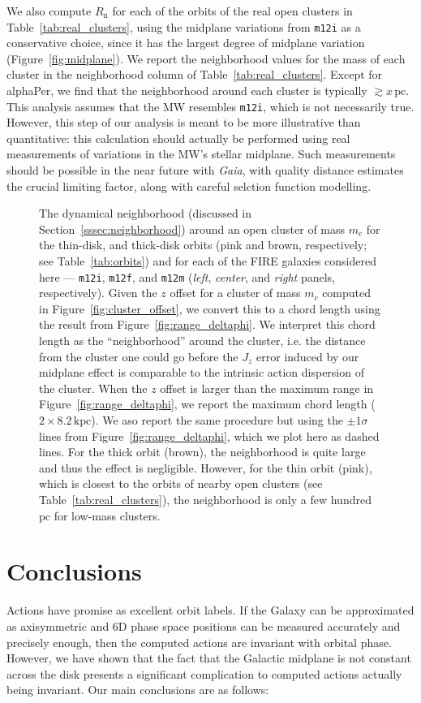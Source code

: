 \documentclass[twocolumn]{aastex62}
\newcommand{\pc}{\text{pc}}
\newcommand{\kpc}{\text{kpc}}
\newcommand{\mi}{\texttt{m12i}}
\newcommand{\mf}{\texttt{m12f}}
\newcommand{\mm}{\texttt{m12m}}
\newcommand{\n}{\text{n}}
\newcommand{\thincolor}{pink}
\newcommand{\thickcolor}{brown}
\begin{document}
We also compute $R_{\n}$ for each of the orbits of the real open clusters in
Table~\ref{tab:real_clusters}, using the midplane variations from
\mi{} as a conservative choice, since it has the largest degree of
midplane variation (Figure~\ref{fig:midplane}). We report the neighborhood
values for the mass of each cluster in the neighborhood column of
Table~\ref{tab:real_clusters}. Except for alphaPer, we find that the
neighborhood around each cluster is typically $\gtrsim x\,\pc$. This analysis
assumes that the MW resembles \mi{}, which is not necessarily true. However,
this step of our analysis is meant to be more illustrative than quantitative:
this calculation should actually be performed using real measurements of
variations in the MW's stellar midplane. Such measurements should be possible
in the near future with {\em Gaia}, with quality distance estimates the
crucial limiting factor, along with careful selction function modelling.

\begin{figure}
\caption{The dynamical neighborhood (discussed in
Section~\ref{sssec:neighborhood}) around an open cluster of mass $m_c$ for the
thin-disk, and thick-disk orbits (\thincolor{} and \thickcolor{},
respectively; see Table~\ref{tab:orbits}) and for each of the FIRE galaxies
considered here ---
\mi{}, \mf{}, and \mm{} ({\em left}, {\em center}, and {\em right} panels,
respectively). Given the $z$ offset for a cluster of mass $m_c$ computed in
Figure~\ref{fig:cluster_offset}, we convert this to a chord length using the
result from Figure~\ref{fig:range_deltaphi}. We interpret this chord length as
the ``neighborhood'' around the cluster, i.e. the distance from the cluster
one could go before the $J_z$ error induced by our midplane effect is
comparable to the intrinsic action dispersion of the cluster. When the $z$
offset is larger than the maximum range in Figure~\ref{fig:range_deltaphi}, we
report the maximum chord length ($2\times8.2\,\kpc$). We aso report the same
procedure but using the $\pm1\sigma$ lines from
Figure~\ref{fig:range_deltaphi}, which we plot here as dashed lines. For the
thick orbit (\thickcolor), the neighborhood is quite large and thus the effect
is negligible. However, for the thin orbit (\thincolor), which is closest to
the orbits of nearby open clusters (see Table~\ref{tab:real_clusters}), the
neighborhood is only a few hundred $\pc$ for low-mass clusters.}
\label{fig:Rn_mc}
\end{figure}

\section{Conclusions}\label{sec:conclusion}
Actions have promise as excellent orbit labels. If the Galaxy can be
approximated as axisymmetric and 6D phase space positions can be measured
accurately and precisely enough, then the computed actions are invariant with
orbital phase. However, we have shown that the fact that the Galactic midplane
is not constant across the disk presents a significant complication to
computed actions actually being invariant. Our main conclusions are as
follows:
\end{document}
